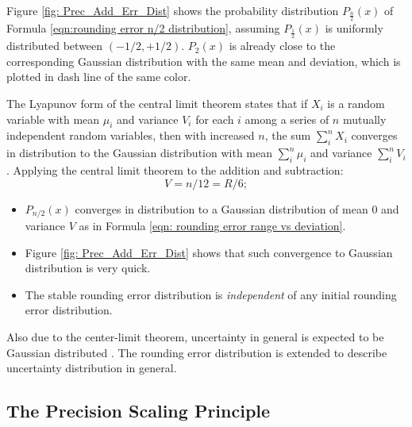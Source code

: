 \documentclass[twoside]{article}
\numberwithin{equation}{section}
\begin{document}
Figure \ref{fig: Prec_Add_Err_Dist} shows the probability distribution $P_{\frac{n}{2}}(x)$ of Formula \eqref{eqn:rounding error n/2 distribution}, assuming $P_{\frac{1}{2}}(x)$ is uniformly distributed between $(-1/2, +1/2)$.  
$P_{2}(x)$ is already close to the corresponding Gaussian distribution with the same mean and deviation, which is plotted in dash line of the same color.

The Lyapunov form of the central limit theorem \cite{Probability_Statistics} states that if $X_i$ is a random variable with mean $\mu_i$ and variance $V_i$ for each $i$ among a series of $n$ mutually independent random variables, then with increased $n$, the sum $\sum\limits_{i}^{n} X_i$ converges in distribution to the Gaussian distribution with mean $\sum\limits_{i}^{n} \mu_i$ and variance $\sum\limits_{i}^{n} V_i$. Applying the central limit theorem to the addition and subtraction: 
\begin{equation}
\label{eqn: rounding error range vs deviation}
V = n/12 = R/6;
\end{equation}
\begin{itemize}
\item $P_{n/2}(x)$ converges in distribution to a Gaussian distribution of mean $0$ and variance $V$ as in Formula \eqref{eqn: rounding error range vs deviation}.

\item Figure \ref{fig: Prec_Add_Err_Dist} shows that such convergence to Gaussian distribution is very quick. 

\item The stable rounding error distribution is \emph{independent} of any initial rounding error distribution. 
\end{itemize} 

Also due to the center-limit theorem, uncertainty in general is expected to be Gaussian distributed \cite{Statistical_Methods} \cite{Probability_Statistics}. 
The rounding error distribution is extended to describe uncertainty distribution in general.



\subsection{The Precision Scaling Principle}
\end{document}
